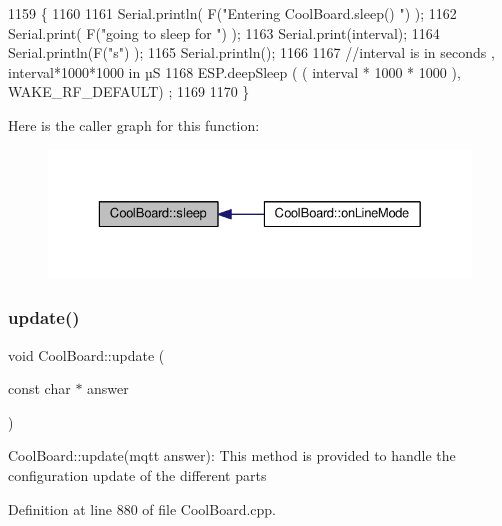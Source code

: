 \begin{DoxyCode}
1159 \{
1160 
1161     Serial.println( F(\textcolor{stringliteral}{"Entering CoolBoard.sleep() "}) );
1162     Serial.print( F(\textcolor{stringliteral}{"going to sleep for "}) );
1163     Serial.print(interval);
1164     Serial.println(F(\textcolor{stringliteral}{"s"}) );
1165     Serial.println();
1166     
1167     \textcolor{comment}{//interval is in seconds , interval*1000*1000 in µS}
1168     ESP.deepSleep ( ( interval * 1000 * 1000 ), WAKE\_RF\_DEFAULT) ;
1169 
1170 \}
\end{DoxyCode}
Here is the caller graph for this function\+:\nopagebreak
\begin{figure}[H]
\begin{center}
\leavevmode
\includegraphics[width=329pt]{d7/df9/class_cool_board_a069952cdcb2e7f68518aa429eceadb6e_icgraph}
\end{center}
\end{figure}
\mbox{\label{class_cool_board_a8612756d3f73198cdde857a66f0fe690}} 
\subsubsection{\texorpdfstring{update()}{update()}}
{\footnotesize\ttfamily void Cool\+Board\+::update (\begin{DoxyParamCaption}\item[{const char $\ast$}]{answer }\end{DoxyParamCaption})}

Cool\+Board\+::update(mqtt answer)\+: This method is provided to handle the configuration update of the different parts 

Definition at line 880 of file Cool\+Board.\+cpp.



